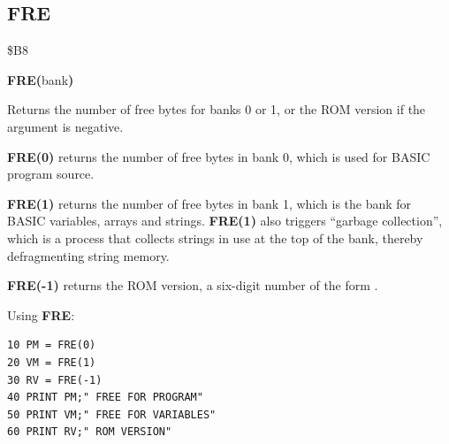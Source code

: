 
\newpage
\subsection{FRE}
\begin{description}[leftmargin=2cm,style=nextline]
\item [Token:] \$B8
\item [Format:] {\bf FRE(}bank{\bf)}
\item [Usage:] Returns the number of free bytes for banks 0 or 1,
               or the ROM version if the argument is negative.

               {\bf FRE(0)} returns the number of free bytes in
               bank 0, which is used for BASIC program source.

               {\bf FRE(1)} returns the number of free bytes in
               bank 1, which is the bank for BASIC variables, arrays
               and strings. {\bf FRE(1)} also triggers
               ``garbage collection'', which is a process that collects
               strings in use at the top of the bank, thereby
               defragmenting string memory.

               {\bf FRE(-1)} returns the ROM version, a six-digit number
               of the form .

\item [Example:] Using {\bf FRE}:
\begin{tcolorbox}[colback=black,coltext=white]
\verbatimfont{\codefont}
\begin{verbatim}
10 PM = FRE(0)
20 VM = FRE(1)
30 RV = FRE(-1)
40 PRINT PM;" FREE FOR PROGRAM"
50 PRINT VM;" FREE FOR VARIABLES"
60 PRINT RV;" ROM VERSION"
\end{verbatim}
\end{tcolorbox}
\end{description}


\newpage
